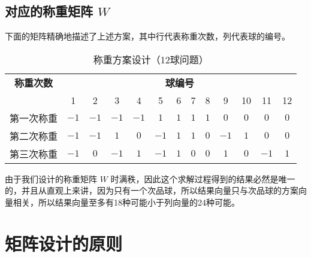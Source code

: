 \documentclass[12pt, a4paper]{ctexart}
\begin{document}
\subsection*{对应的称重矩阵 $W$}
下面的矩阵精确地描述了上述方案，其中行代表称重次数，列代表球的编号。
\begin{table}[h]
    \centering
    \caption{称重方案设计（12球问题）}
    \begin{tabular}{|c|cccccccccccc|}
    \hline
    \textbf{称重次数} & \multicolumn{12}{c|}{\textbf{球编号}} \\
    \cline{2-13}
     & 1 & 2 & 3 & 4 & 5 & 6 & 7 & 8 & 9 & 10 & 11 & 12 \\
    \hline
    第一次称重 & $-1$ & $-1$ & $-1$ & $-1$ & $1$ & $1$ & $1$ & $1$ & $0$ & $0$ & $0$ & $0$ \\
    第二次称重 & $-1$ & $-1$ & $1$ & $0$ & $-1$ & $1$ & $1$ & $0$ & $-1$ & $1$ & $0$ & $0$ \\
    第三次称重 & $-1$ & $0$ & $-1$ & $1$ & $-1$ & $1$ & $0$ & $0$ & $1$ & $0$ & $-1$ & $1$ \\
    \hline
    \end{tabular}
    \end{table}
由于我们设计的称重矩阵 $W$ 时满秩，因此这个求解过程得到的结果必然是唯一的，并且从直观上来讲，因为只有一个次品球，所以结果向量只与次品球的方案向量相关，所以结果向量至多有18种可能小于列向量的24种可能。


\section{矩阵设计的原则}
\end{document}
